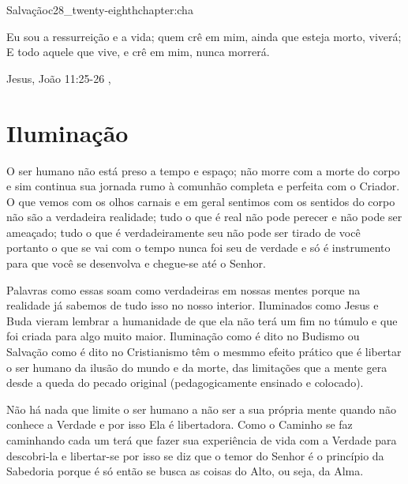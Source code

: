 \begin{chapterpage}{Salvação}{c28_twenty-eighthchapter:cha}

\begin{myquotation}Eu sou a ressurreição e a vida; quem crê em mim, ainda que esteja morto, viverá; E todo aquele que vive, e crê em mim, nunca morrerá.

\par\vspace*{15mm}
\mbox{}\hfill \emdash{}Jesus, João 11:25-26 
, %
\par\end{myquotation}

\end{chapterpage}



\section{Iluminação}\label{c1_basicformatting:sec}

\emdash{}O ser humano não está preso a tempo e espaço; não morre com a morte do corpo e sim continua sua jornada rumo à comunhão completa e perfeita com o Criador. O que vemos com os olhos carnais e em geral sentimos com os sentidos do corpo não são a verdadeira realidade; tudo o que é real não pode perecer e não pode ser ameaçado; tudo o que é verdadeiramente seu não pode ser tirado de você portanto o que se vai com o tempo nunca foi seu de verdade e só é instrumento para que você se desenvolva e chegue-se até o Senhor.

\emdash{}Palavras como essas soam como verdadeiras em nossas mentes porque na realidade já sabemos de tudo isso no nosso interior. Iluminados como Jesus e Buda vieram lembrar a humanidade de que ela não terá um fim no túmulo e que foi criada para algo muito maior. Iluminação como é dito no Budismo ou Salvação como é dito no Cristianismo têm o mesmmo efeito prático que é libertar o ser humano da ilusão do mundo e da morte, das limitações que a mente gera desde a queda do pecado original (pedagogicamente ensinado e colocado).

\emdash{}Não há nada que limite o ser humano a não ser a sua própria mente quando não conhece a Verdade e por isso Ela é libertadora. Como o Caminho se faz caminhando cada um terá que fazer sua experiência de vida com a Verdade para descobri-la e libertar-se por isso se diz que o temor do Senhor é o princípio da Sabedoria porque é só então se busca as coisas do Alto, ou seja, da Alma.

